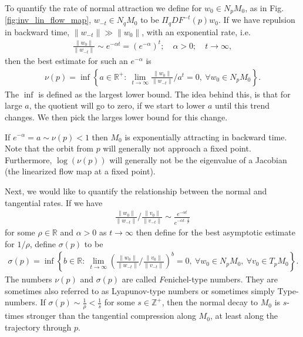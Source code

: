 To quantify the rate of normal attraction we define for $w_0 \in N_{p}M_0$, as in Fig. \ref{fig:inv_lin_flow_map}, $w_{-t}\in N_{q}M_0$ to be $\Pi_{q}DF^{-t}(p)w_0 $. If we have repulsion in backward time, $\| w_{-t}\| \gg \| w_0\|$, with an exponential rate, i.e. 
\begin{align}
	\frac{\|w_0 \|}{\| w_{-t}\|}\sim e^{-\alpha t}	= (e^{-\alpha })^{t}; \quad \alpha >0; \quad t \to \infty ,
\end{align}
then the best estimate for such an $e^{-\alpha }$ is 
\begin{align}
	\boxed{
		\nu(p) = \inf \left\{ a \in \mathbb{R}^{+}:\ \lim_{t\to\infty }{\frac{\|w_0\|}{\|w_{-t}\|}}/{a^{t}} = 0,\ \forall w_0 \in N_{p}M_0 \right\}.
	}
\end{align}
The $\inf $ is defined as the largest lower bound. The idea behind this, is that for large $a$, the quotient will go to zero, if we start to lower $a$ until this trend changes. We then pick the larges lower bound for this change.

If $e^{-\alpha }=a \sim \nu(p) < 1$ then $M_0$ is exponentially attracting in backward time. Note that the orbit from $p$ will generally not approach a fixed point. Furthermore, $\log(\nu(p))$ will generally not be the eigenvalue of a Jacobian (the linearized flow map at a fixed point).

Next, we would like to quantify the relationship between the normal and tangential rates. If we have
\begin{align}
{\frac{\| w_0 \|}{\|w_{-t}\|}}/{\frac{\|v_0\|}{\|v_{-t}\|}} \sim \frac{e^{-\alpha t}}{e^{-\alpha t \cdot \frac{1}{\rho}}}
\end{align}
for some $\rho \in \mathbb{R}$ and $\alpha >0$ as $t\to \infty $ then define for the best asymptotic estimate for $1/\rho$, define $\sigma(p)$ to be
\begin{align}
	\boxed{
		\sigma(p) = \inf \left\{ b \in \mathbb{R}:\ \lim_{t\to \infty }\left({\frac{\|w_0\|}{\|w_{-t}\|}}/{\frac{\|v_0\|}{\|v_{-t}\|}}\right)^{b} = 0,\ \forall w_0 \in N_{p}M_0,\ \forall v_0 \in T_{p}M_0 \right\}.
	}
\end{align}
The numbers $\nu(p)$ and $\sigma(p)$ are called {\emph Fenichel-type numbers}. They are sometimes also referred to as Lyapunov-type numbers or sometimes simply Type-numbers. If $\sigma(p) \sim \frac{1}{\rho} < \frac{1}{s}$ for some $s\in \mathbb{Z}^{+}$, then the normal decay to $M_0$ is $s$-times stronger than the tangential compression along $M_0$, at least along the trajectory through $p$.

